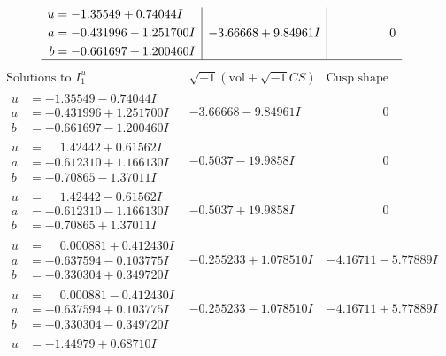 \documentclass[1p]{elsarticle_modified}
\theoremstyle{definition}
\newcommand{\I}{\sqrt{-1}}
\begin{document}
$$\begin{array}{c|c|c}
\begin{aligned}
u &= -1.35549 + 0.74044 I \\
a &= -0.431996 - 1.251700 I \\
b &= -0.661697 + 1.200460 I\end{aligned}
 & -3.66668 + 9.84961 I & \phantom{-0.000000 } 0\\
 \hline 
 \end{array}$$\newpage$$\begin{array}{c|c|c}  
\text{Solutions to }I^u_{1}& \I (\text{vol} + \sqrt{-1}CS) & \text{Cusp shape}\\
 \hline 
\begin{aligned}
u &= -1.35549 - 0.74044 I \\
a &= -0.431996 + 1.251700 I \\
b &= -0.661697 - 1.200460 I\end{aligned}
 & -3.66668 - 9.84961 I & \phantom{-0.000000 } 0 \\ \hline\begin{aligned}
u &= \phantom{-}1.42442 + 0.61562 I \\
a &= -0.612310 + 1.166130 I \\
b &= -0.70865 - 1.37011 I\end{aligned}
 & -0.5037 - 19.9858 I & \phantom{-0.000000 } 0 \\ \hline\begin{aligned}
u &= \phantom{-}1.42442 - 0.61562 I \\
a &= -0.612310 - 1.166130 I \\
b &= -0.70865 + 1.37011 I\end{aligned}
 & -0.5037 + 19.9858 I & \phantom{-0.000000 } 0 \\ \hline\begin{aligned}
u &= \phantom{-}0.000881 + 0.412430 I \\
a &= -0.637594 - 0.103775 I \\
b &= -0.330304 + 0.349720 I\end{aligned}
 & -0.255233 + 1.078510 I & -4.16711 - 5.77889 I \\ \hline\begin{aligned}
u &= \phantom{-}0.000881 - 0.412430 I \\
a &= -0.637594 + 0.103775 I \\
b &= -0.330304 - 0.349720 I\end{aligned}
 & -0.255233 - 1.078510 I & -4.16711 + 5.77889 I \\ \hline\begin{aligned}
u &= -1.44979 + 0.68710 I \\

\end{aligned}
\end{array}$$
\end{document}
